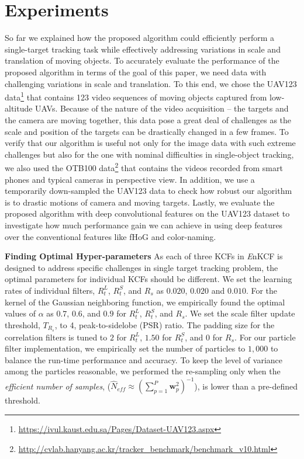 \documentclass[10pt,twocolumn,letterpaper]{article}
\begin{document}
\section{Experiments} \label{sc:Experiments}
So far we explained how the proposed algorithm could efficiently
perform a single-target tracking task while effectively addressing
variations in scale and translation of moving objects. To accurately
evaluate the performance of the proposed algorithm in terms of the
goal of this paper, we need data with challenging variations in scale
and translation. To this end, we chose the UAV123
data\footnote{\url{https://ivul.kaust.edu.sa/Pages/Dataset-UAV123.aspx}}\cite{mueller2016uav123}
that contains 123 video sequences of moving objects captured from
low-altitude UAVs. Because of the nature of the video acquisition --
the targets and the camera are moving together, this data pose a great
deal of challenges as the scale and position of the targets can be
drastically changed in a few frames. To verify that our algorithm is
useful not only for the image data with such extreme challenges but
also for the one with nominal difficulties in single-object tracking,
we also used the OTB100
data\footnote{\url{http://cvlab.hanyang.ac.kr/tracker_benchmark/benchmark_v10.html}}
that contains the videos recorded from smart phones and typical
cameras in perspective view. In addition, we use a temporarily
down-sampled the UAV123 data to check how robust our algorithm is to
drastic motions of camera and moving targets. Lastly, we evaluate the
proposed algorithm with deep convolutional features on the UAV123
dataset to investigate how much performance gain we can achieve in
using deep features over the conventional features like fHoG and
color-naming.

\textbf{Finding Optimal Hyper-parameters} As each of three KCFs in
       {\it E}nKCF is designed to address specific challenges in
       single target tracking problem, the optimal parameters for
       individual KCFs should be different. We set the learning rates
       of individual filters, $R_{t}^{L}$, $R_{t}^{S}$, and $R_{s}$ as
       $0.020$, $0.020$ and $0.010$. For the kernel of the Gaussian
       neighboring function, we empirically found the optimal values
       of $\alpha$ as $0.7$, $0.6$, and $0.9$ for $R_{t}^{L}$,
       $R_{t}^{S}$, and $R_{s}$. We set the scale filter update
       threshold, $T_{R_{s}}$, to 4, peak-to-sidelobe (PSR) ratio. The
       padding size for the correlation filters is tuned to $2$ for
       $R_{t}^{L}$, $1.50$ for $R_{t}^{S}$, and $0$ for $R_{s}$. For
       our particle filter implementation, we empirically set the
       number of particles to $1,000$ to balance the run-time
       performance and accuracy. To keep the level of variance among
       the particles reasonable, we performed the re-sampling only
       when the \textit{efficient number of samples}, ($ \hat{N}_{eff}
       \approx (\sum_{p=1}^{P}\mathbf{w}_{p}^{2})^{-1} $), is lower
       than a pre-defined threshold.
\end{document}
